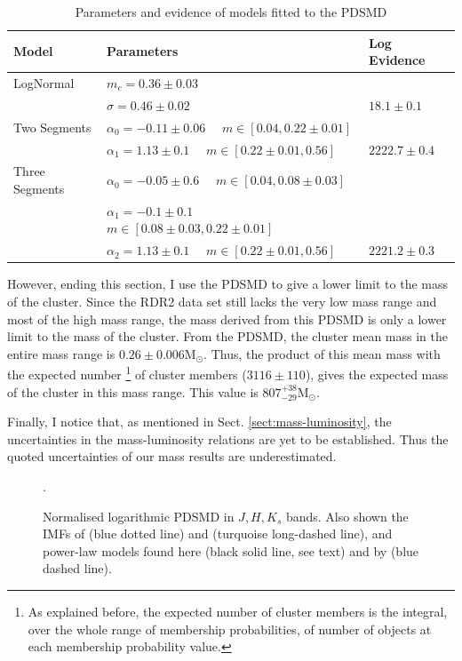 \begin{table}[ht!]
\caption{Parameters and evidence of models fitted to the PDSMD}
\begin{center}
\begin{tabular}{lll}
Model&Parameters& Log Evidence\\
\hline
LogNormal&$m_c=0.36\pm0.03$&\\
                 &$\sigma=0.46\pm0.02$ & $18.1 \pm 0.1$\\
\hline
Two Segments &$\alpha_0=-0.11\pm0.06$ \ \ $m \in [0.04,0.22\pm0.01]$ & \\ 
&  $\alpha_1=1.13\pm0.1$ \ \ $m \in [0.22\pm0.01,0.56]$&$2222.7\pm0.4$\\
\hline
Three Segments &$\alpha_0=-0.05\pm0.6$ \ \ $m \in [0.04,0.08\pm0.03]$ & \\
                          &$\alpha_1=-0.1\pm0.1$ \ \ $m \in [0.08\pm0.03,0.22\pm0.01]$ & \\ 
                          &$\alpha_2=1.13\pm0.1$ \ \ $m \in [0.22\pm0.01,0.56]$&$2221.2\pm 0.3$\\
\hline
\end{tabular}
\end{center}
\label{tab:fitPDSMD}
\end{table}%

However, ending this section, I use the PDSMD to give a lower limit to the mass of the cluster. Since the RDR2 data set  still lacks the very low mass range and most of the high mass range, the mass derived from this PDSMD is only a lower limit to the mass of the cluster. From the PDSMD, the cluster mean mass in the entire mass range is $0.26 \pm 0.006 \mathrm{M_{\odot}}$. Thus, the product of this mean mass with the expected number \footnote{As explained before, the expected number of cluster members is the integral, over the whole range of membership probabilities, of number of objects at each membership probability value.} of cluster members ($3116 \pm 110$), gives the expected mass of the cluster in this mass range. This  value is $807^{+38}_{-29} \mathrm{M_{\odot}}$. 

Finally, I notice that, as mentioned in Sect. \ref{sect:mass-luminosity}, the uncertainties in the mass-luminosity relations are yet to be established. Thus the quoted uncertainties of our mass results are underestimated.

\begin{figure}[htbp]
\begin{center}
\caption{Normalised logarithmic PDSMD in $J,H,K_s$ bands. Also shown the IMFs of \citet{Chabrier2005} (blue dotted line) and  \citet{Thies2007} (turquoise long-dashed line), and power-law models found here (black solid line, see text) and by \citet{Bouy2015} (blue dashed line).}
\label{fig:MassFunction}.
\end{center}
\end{figure}

